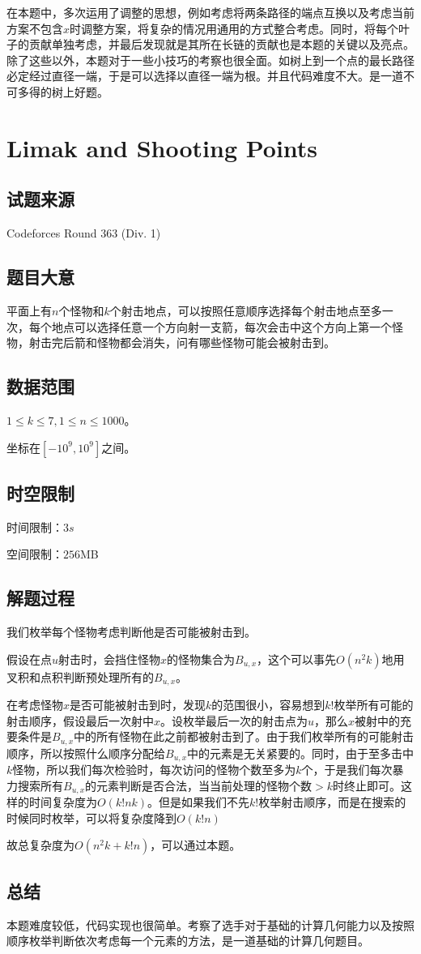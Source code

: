 \documentclass[12pt]{article}
\begin{document}
在本题中，多次运用了调整的思想，例如考虑将两条路径的端点互换以及考虑当前方案不包含$x$时调整方案，将复杂的情况用通用的方式整合考虑。同时，将每个叶子的贡献单独考虑，并最后发现就是其所在长链的贡献也是本题的关键以及亮点。除了这些以外，本题对于一些小技巧的考察也很全面。如树上到一个点的最长路径必定经过直径一端，于是可以选择以直径一端为根。并且代码难度不大。是一道不可多得的树上好题。

\newpage

\section{Limak and Shooting Points}

\subsection{试题来源}
Codeforces Round 363 (Div. 1)

\subsection{题目大意}

平面上有$n$个怪物和$k$个射击地点，可以按照任意顺序选择每个射击地点至多一次，每个地点可以选择任意一个方向射一支箭，每次会击中这个方向上$\textbf{第一个}$怪物，射击完后箭和怪物都会消失，问有哪些怪物可能会被射击到。

\subsection{数据范围}
$1\le k\le 7,1\le n\le 1000$。

坐标在$[-10^9,10^9]$之间。

\subsection{时空限制}
时间限制：$3s$

空间限制：$256$MB

\subsection{解题过程}
我们枚举每个怪物考虑判断他是否可能被射击到。

假设在点$u$射击时，会挡住怪物$x$的怪物集合为$B_{u,x}$，这个可以事先$O(n^2k)$地用叉积和点积判断预处理所有的$B_{u,x}$。

在考虑怪物$x$是否可能被射击到时，发现$k$的范围很小，容易想到$k!$枚举所有可能的射击顺序，假设最后一次射中$x$。设枚举最后一次的射击点为$u$，那么$x$被射中的充要条件是$B_{u, x}$中的所有怪物在此之前都被射击到了。由于我们枚举所有的可能射击顺序，所以按照什么顺序分配给$B_{u,x}$中的元素是无关紧要的。同时，由于至多击中$k$怪物，所以我们每次检验时，每次访问的怪物个数至多为$k$个，于是我们每次暴力搜索所有$B_{u,x}$的元素判断是否合法，当当前处理的怪物个数$>k$时终止即可。这样的时间复杂度为$O(k!nk)$。但是如果我们不先$k!$枚举射击顺序，而是在搜索的时候同时枚举，可以将复杂度降到$O(k!n)$

故总复杂度为$O(n^2k+k!n)$，可以通过本题。

\subsection{总结}
本题难度较低，代码实现也很简单。考察了选手对于基础的计算几何能力以及按照顺序枚举判断依次考虑每一个元素的方法，是一道基础的计算几何题目。
\end{document}
